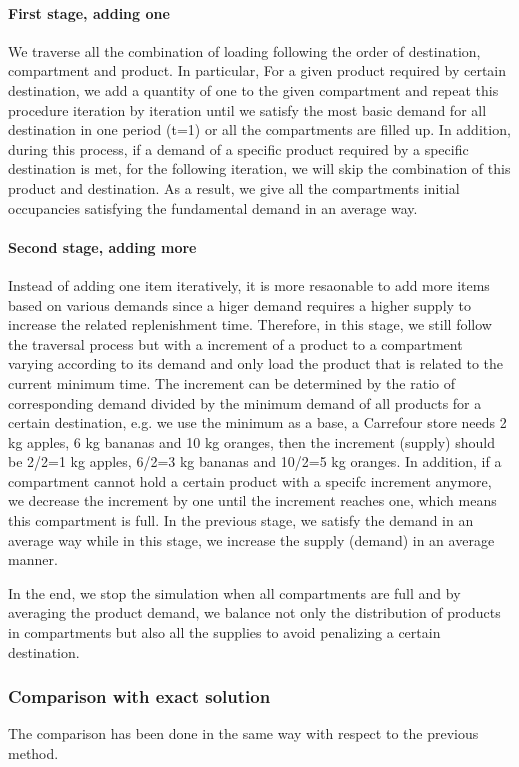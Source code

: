 \documentclass{article}
\begin{document}
\paragraph{First stage, adding one}
We traverse all the combination of loading following the order of destination, compartment and product. In particular, For a given product required by certain destination, we add a quantity of one to the given compartment and repeat this procedure iteration by iteration until we satisfy the most basic demand for all destination in one period (t=1) or all the compartments are filled up. In addition, during this process, if a demand of a specific product required by a specific destination is met, for the following iteration, we will skip the combination of this product and destination. As a result, we give all the compartments initial occupancies satisfying the fundamental demand in an average way.
\paragraph{Second stage, adding more}
Instead of adding one item iteratively, it is more resaonable to add more items based on various demands since a higer demand requires a higher supply to increase the related replenishment time. Therefore, in this stage, we still follow the traversal process but with a increment of a product to a compartment varying according to its demand and only load the product that is related to  the current minimum time. The increment can be determined by the ratio of corresponding demand divided by the minimum demand of all products for a certain destination, e.g. we use the minimum as a base, a Carrefour store needs 2 kg apples, 6 kg bananas and 10 kg oranges, then the increment (supply) should be 2/2=1 kg apples, 6/2=3 kg bananas and 10/2=5 kg oranges. In addition, if a compartment cannot hold a certain product with a specifc increment anymore, we decrease the increment by one until the increment reaches one, which means this compartment is full. In the previous stage, we satisfy the demand in an average way while in this stage, we increase the supply (demand) in an average manner. 

In the end, we stop the simulation when all compartments are full and by averaging the product demand, we balance not only the distribution of products in compartments but also all the supplies to avoid penalizing a certain destination.

\subsubsection{Comparison with exact solution}
The comparison has been done in the same way with respect to the previous method. 
\end{document}
